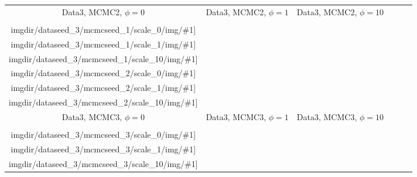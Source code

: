 {\begin{tabular}{cccccc}
    {\tiny Data3, MCMC2, $\phi=0$} &
    {\tiny Data3, MCMC2, $\phi=1$} &
    {\tiny Data3, MCMC2, $\phi=10$} \\
    \texttt{[image: \\imgdir/dataseed\_3/mcmcseed\_1/scale\_0/img/\#1]} &
    \texttt{[image: \\imgdir/dataseed\_3/mcmcseed\_1/scale\_1/img/\#1]} &
    \texttt{[image: \\imgdir/dataseed\_3/mcmcseed\_1/scale\_10/img/\#1]} &
    \texttt{[image: \\imgdir/dataseed\_3/mcmcseed\_2/scale\_0/img/\#1]} &
    \texttt{[image: \\imgdir/dataseed\_3/mcmcseed\_2/scale\_1/img/\#1]} &
    \texttt{[image: \\imgdir/dataseed\_3/mcmcseed\_2/scale\_10/img/\#1]} \\
    {\tiny Data3, MCMC3, $\phi=0$} &
    {\tiny Data3, MCMC3, $\phi=1$} &
    {\tiny Data3, MCMC3, $\phi=10$} &
    & & \\
    \texttt{[image: \\imgdir/dataseed\_3/mcmcseed\_3/scale\_0/img/\#1]} &
    \texttt{[image: \\imgdir/dataseed\_3/mcmcseed\_3/scale\_1/img/\#1]} &
    \texttt{[image: \\imgdir/dataseed\_3/mcmcseed\_3/scale\_10/img/\#1]} &
    & & \\
  \end{tabular}
}

